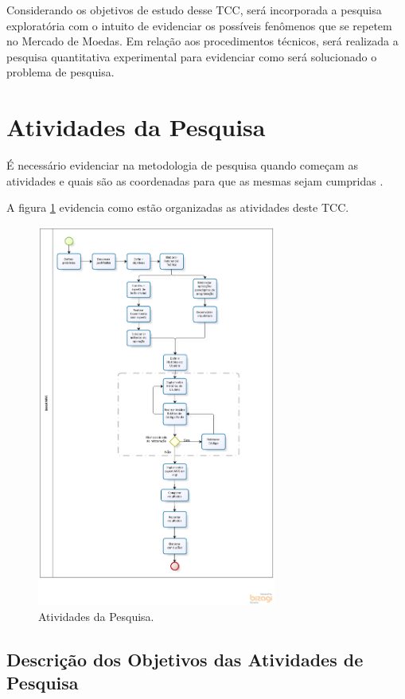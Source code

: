 Considerando os objetivos de estudo desse TCC, será incorporada a pesquisa exploratória com o intuito de evidenciar os possíveis fenômenos que se repetem no Mercado de Moedas. Em relação aos procedimentos técnicos, será realizada a pesquisa quantitativa experimental para evidenciar como será solucionado o problema de pesquisa.

\section{Atividades da Pesquisa}

É necessário evidenciar na metodologia de pesquisa quando começam as atividades e quais são as coordenadas para que as mesmas sejam cumpridas \cite{forcon2014}.

A figura \ref{metodologia} evidencia como estão organizadas as atividades deste TCC.

\begin{figure}[H]
\centering
\includegraphics[width=0.7\textwidth]{figuras/metodologia}
\caption{Atividades da Pesquisa.} 
\label{metodologia}
\end{figure}

\subsection{Descrição dos Objetivos das Atividades de Pesquisa}

